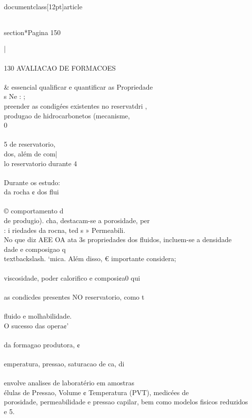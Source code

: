 \\documentclass[12pt]{article}
\begin{document}
\\section*{Pagina 150}

|\\
\\
130 AVALIACAO DE FORMACOES\\
\\& essencial qualificar e quantificar as Propriedade\\
s Ne : ;\\
preender as condigées existentes no reservatdri ,\\
produgao de hidrocarbonetos (mecanisme,\\
0\\
\\
5 de reservatorio,\\
dos, além de com|\\
lo reservatorio durante 4\\
\\
Durante os estudo:\\
da rocha ¢ dos flui\\
\\
© comportamento d\\
de produgio). cha, destacam-se a porosidade, per\\
: i riedades da rocna, ted s » Permeabili.\\
No que diz AEE OA ata 3s propriedades dos fluidos, incluem-se a densidade\\
dade e composigao q \\textbackslash{}. ‘mica. Além disso, € importante considera;\\
\\
viscosidade, poder calorifico e composi¢a0 qui\\
\\
as condicdes presentes NO reservatorio, como t\\
\\
fluido e molhabilidade.\\
O sucesso das opera¢'\\
\\
da formagao produtora, ¢\\
\\
emperatura, pressao, saturacao de ca, di\\
\\
envolve analises de laboratério em amostras\\
élulas de Pressao, Volume ¢ Temperatura (PVT), medicées de\\
porosidade, permeabilidade e pressao capilar, bem como modelos fisicos reduzidos e 5.\\
\end{document}
